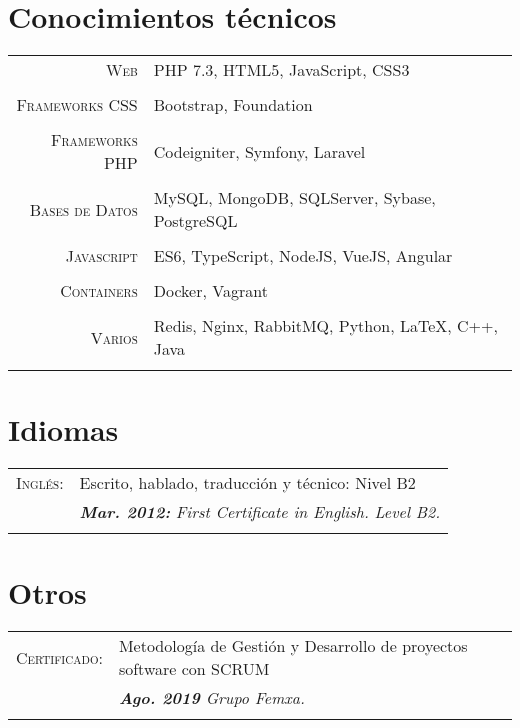\documentclass[a4paper,10pt]{article}
\begin{document}
\section{Conocimientos técnicos}
\begin{tabular}{r|p{11cm}}
	 
	\textsc{Web}& PHP 7.3, HTML5, JavaScript, CSS3 \\&\\
	\textsc{Frameworks CSS}& Bootstrap, Foundation \\&\\
	\textsc{Frameworks PHP}& Codeigniter, Symfony, Laravel \\&\\
	\textsc{Bases de Datos}& MySQL, MongoDB, SQLServer, Sybase, PostgreSQL \\&\\
	\textsc{Javascript}& ES6, TypeScript, NodeJS, VueJS, Angular \\&\\
	\textsc{Containers}& Docker, Vagrant \\&\\
	\textsc{Varios}& Redis, Nginx, RabbitMQ, Python, \LaTeX{}, C++, Java\\&\\

\end{tabular}

\section{Idiomas}
\begin{tabular}{rl}
	\textsc{Inglés:}&	Escrito, hablado, traducción y técnico: Nivel B2\\&
	\emph{\textbf{Mar. 2012:} First Certificate in English. Level B2.}\\&\\	
\end{tabular}

\section{Otros}
\begin{tabular}{rl}
	\textsc{Certificado:}&	Metodología de Gestión y Desarrollo de proyectos software con SCRUM\\&
	\emph{\textbf{Ago. 2019} Grupo Femxa.}\\&\\	
\end{tabular}
\end{document}
